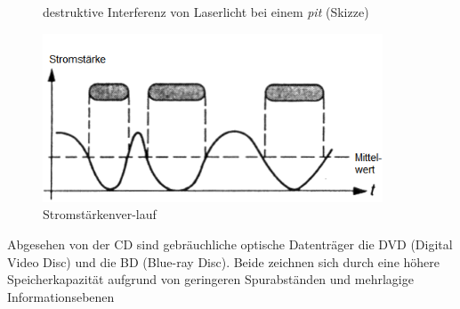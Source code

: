 \begin{figure}[h]
\begin{center}
\begin{minipage}[t]{0.3\textwidth}
\begin{center}
                \caption[destruktive Interferenz von Laserlicht bei einem \textit{pit} (Skizze) \newline \url{http://www.muenster.de/~asshoff/physik/cd/image50.gif} (zuletzt aufgerufen am 07.08.2015)]{destruktive Interferenz von Laserlicht bei einem \textit{pit} (Skizze)}
                \label{fig:cdlaser}
            \end{center}
        \end{minipage}
        \hspace{0.025\textwidth}
        \begin{minipage}[t]{0.3\textwidth}
            \begin{center}
                \includegraphics[width=0.9\textwidth]{Bilder/Optische_Datentraeger_Die_Compact_Disc/Funktionsweise/cdstrom.png}
                \caption[Stromstärkenverlauf \newline \url{http://www.muenster.de/~asshoff/physik/cd/image51.gif} (zuletzt aufgerufen am 07.08.2015)]{Stromstärkenver-lauf}
                \label{fig:cdstrom}
            \end{center}
        \end{minipage}
    \end{center}
\end{figure}

Abgesehen von der CD sind gebräuchliche optische Datenträger die DVD (Digital
Video Disc) und die BD (Blue-ray Disc). Beide zeichnen sich durch eine höhere
Speicherkapazität aufgrund von geringeren Spurabständen und mehrlagige
Informationsebenen
